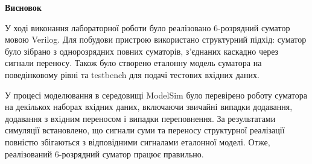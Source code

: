 \documentclass[12pt,a4paper]{article}
\begin{document}
    \begin{center} \textbf{\Large Висновок} \end{center}

    У ході виконання лабораторної роботи було реалізовано 6-розрядний суматор мовою Verilog. Для побудови пристрою використано структурний підхід: суматор було зібрано з однорозрядних повних суматорів, з'єднаних каскадно через сигнали переносу. Також було створено еталонну модель суматора на поведінковому рівні та testbench для подачі тестових вхідних даних.

    У процесі моделювання в середовищі ModelSim було перевірено роботу суматора на декількох наборах вхідних даних, включаючи звичайні випадки додавання, додавання з вхідним переносом і випадки переповнення. За результатами симуляції встановлено, що сигнали суми та переносу структурної реалізації повністю збігаються з відповідними сигналами еталонної моделі. Отже, реалізований 6-розрядний суматор працює правильно.
\end{document}

